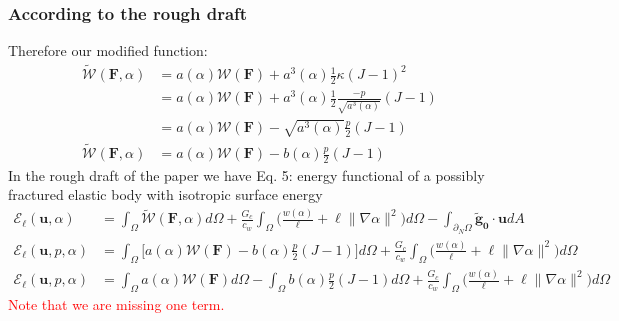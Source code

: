 \documentclass[12pt,3p]{article}
\numberwithin{equation}{section}
\begin{document}
\subsubsection{According to the rough draft}
Therefore our modified function:
\begin{align*}
\widetilde{\mathcal{W}}(\mathbf{F},\alpha) &= a(\alpha)\mathcal{W}(\mathbf{F}) + a^3(\alpha)\frac{1}{2} \kappa (J-1)^2 \\
	&= a(\alpha)\mathcal{W}(\mathbf{F}) + a^3(\alpha)\frac{1}{2} \frac{-p}{\sqrt{a^{3}(\alpha)}} (J-1) \\
	&= a(\alpha)\mathcal{W}(\mathbf{F}) - \sqrt{a^3(\alpha)} \frac{p}{2} (J-1) \\
 \widetilde{\mathcal{W}}(\mathbf{F},\alpha) &= a(\alpha)\mathcal{W}(\mathbf{F}) - b(\alpha) \frac{p}{2} (J-1)
\end{align*}
In the rough draft of the paper we have Eq. 5: energy functional of a possibly fractured elastic body with isotropic surface energy
\begin{align*}
\mathcal{E}_{\ell}(\boldsymbol{u}, \alpha) &=\int_{\Omega} \widetilde{\mathcal{W}}(\mathbf{F},\alpha)  d \Omega + \frac{G_{c}}{c_{w}} \int_{\Omega} \bigg(\frac{w(\alpha)}{\ell}+\ell\|\nabla \alpha\|^{2} \bigg) d \Omega - \int_{\partial_N \Omega} \mathbf{\tilde{g}_0} \cdot \mathbf{u} d A \\
\mathcal{E}_{\ell}(\boldsymbol{u}, p, \alpha) &=\int_{\Omega} \bigg[ a(\alpha)\mathcal{W}(\mathbf{F}) - b(\alpha) \frac{p}{2} (J-1) \bigg] d \Omega + \frac{G_{c}}{c_{w}} \int_{\Omega} \bigg(\frac{w(\alpha)}{\ell}+\ell\|\nabla \alpha\|^{2} \bigg) d \Omega \\
\mathcal{E}_{\ell}(\boldsymbol{u}, p, \alpha) &=\int_{\Omega} a(\alpha)\mathcal{W}(\mathbf{F}) d \Omega - \int_{\Omega} b(\alpha) \frac{p}{2} (J-1) d \Omega + \frac{G_{c}}{c_{w}} \int_{\Omega} \bigg(\frac{w(\alpha)}{\ell}+\ell\|\nabla \alpha\|^{2} \bigg) d \Omega
\end{align*}
\textcolor{red}{Note that we are missing one term.} 

\end{document}
